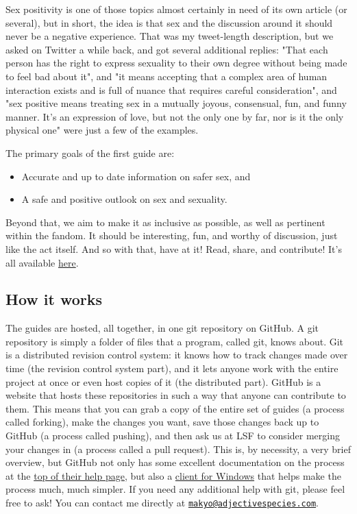 Sex positivity is one of those topics almost certainly in need of its own article (or several), but in short, the idea is that sex and the discussion around it should never be a negative experience. That was my tweet-length description, but we asked on Twitter a while back, and got several additional replies: "That each person has the right to express sexuality to their own degree without being made to feel bad about it", and "it means accepting that a complex area of human interaction exists and is full of nuance that requires careful consideration", and "sex positive means treating sex in a mutually joyous, consensual, fun, and funny manner. It's an expression of love, but not the only one by far, nor is it the only physical one" were just a few of the examples.

The primary goals of the first guide are:

\begin{itemize}
\tightlist
\item
  Accurate and up to date information on safer sex, and
\item
  A safe and positive outlook on sex and sexuality.
\end{itemize}

Beyond that, we aim to make it as inclusive as possible, as well as pertinent within the fandom. It should be interesting, fun, and worthy of discussion, just like the act itself. And so with that, have at it! Read, share, and contribute! It's all available \href{https://github.com/adjspecies/lsf-guides}{here}.

\hypertarget{how-it-works}{%
\subsection{How it works}\label{how-it-works}}

The guides are hosted, all together, in one git repository on GitHub. A git repository is simply a folder of files that a program, called git, knows about. Git is a distributed revision control system: it knows how to track changes made over time (the revision control system part), and it lets anyone work with the entire project at once or even host copies of it (the distributed part). GitHub is a website that hosts these repositories in such a way that anyone can contribute to them. This means that you can grab a copy of the entire set of guides (a process called forking), make the changes you want, save those changes back up to GitHub (a process called pushing), and then ask us at LSF to consider merging your changes in (a process called a pull request). This is, by necessity, a very brief overview, but GitHub not only has some excellent documentation on the process at the \href{https://help.github.com/}{top of their help page}, but also a \href{http://windows.github.com/}{client for Windows} that helps make the process much, much simpler. If you need any additional help with git, please feel free to ask! You can contact me directly at \href{mailto:makyo@adjectivespecies.com}{\nolinkurl{makyo@adjectivespecies.com}}.

